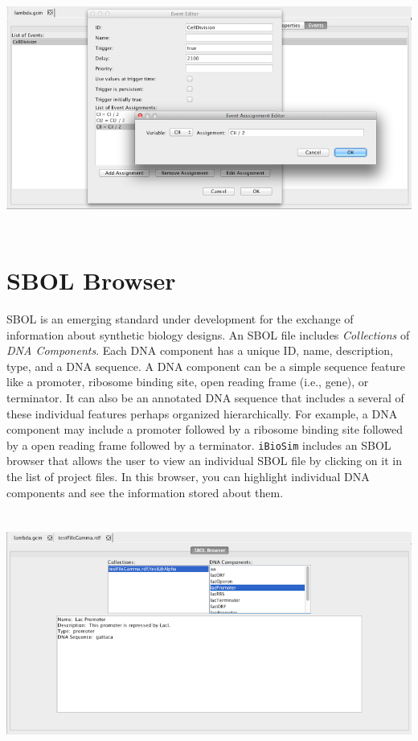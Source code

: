 \documentclass[titlepage,11pt]{article}
\begin{document}
\begin{center}
\includegraphics[height=80mm]{screenshots/event}
\end{center}

\clearpage

\section{\label{SBOL}SBOL Browser}

SBOL is an emerging standard under development for the exchange of information about synthetic biology designs.  An SBOL file includes \emph{Collections} of \emph{DNA Components}.  Each DNA component has a unique ID, name, description, type, and a DNA sequence.  A DNA component can be a simple sequence feature like a promoter, ribosome binding site, open reading frame (i.e., gene), or terminator.  It can also be an annotated DNA sequence that includes a several of these individual features perhaps organized hierarchically.  For example, a DNA component may include a promoter followed by a ribosome binding site followed by a open reading frame followed by a terminator.  {\tt iBioSim} includes an SBOL browser that allows the user to view an individual SBOL file by clicking on it in the list of project files.  In this browser, you can highlight individual DNA components and see the information stored about them.

\begin{center}
\includegraphics[height=80mm]{screenshots/SBOLBrowser}
\end{center}
\end{document}
